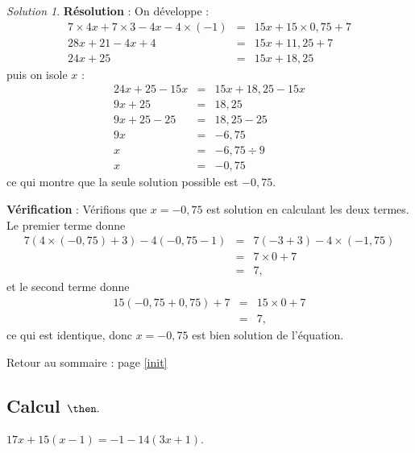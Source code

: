 \documentclass[14pt]{article}
\theoremstyle{remark}
\newtheorem*{sol}{Solution}
\newcounter{n}
\renewcommand{\it}{Retour au sommaire : page \ref{init}
	\subsection{Calcul $ \mathbf{ \then}.$}\label{\then} \stepcounter{n} }
\theoremstyle{plain}
\begin{document}
\begin{sol}
\textbf{Résolution} : On développe : 
\begin{eqnarray*}
7\times 4x + 7\times 3 - 4x - 4\times (-1) &=& 15 x + 15\times 0,75 + 7 \\
28x + 21-4x +4 &=& 15x + 11,25+7\\
24x+25&=& 15x+18,25
\end{eqnarray*}
puis on isole $x$ : 
\begin{eqnarray*}
24x+25-15x&=& 15x+18,25-15x\\
9x+25 &=& 18,25\\
9x+25-25 &=& 18,25-25\\
9x &=& -6,75 \\
x &=& -6,75\div 9 \\
x &=& -0,75
\end{eqnarray*}
ce qui montre que la seule solution possible est  $-0,75$. 

\textbf{Vérification} : Vérifions que $x=-0,75$ est solution en calculant les deux termes. Le premier terme donne \begin{eqnarray*}
7(4\times(-0,75)+3)-4(-0,75-1) &=& 7(-3+3) -4\times(-1,75) \\
&=& 7\times 0 + 7\\
&=& 7,
\end{eqnarray*}et le second terme donne 
\begin{eqnarray*}
15(-0,75+0,75)+7 &=& 15\times 0 + 7 \\ &=& 7,
\end{eqnarray*}ce qui est identique, donc $x=-0,75$ est bien solution de l'équation.
\end{sol}
\it $17x+15(x-1)=-1-14(3x+1)$. 
\end{document}
